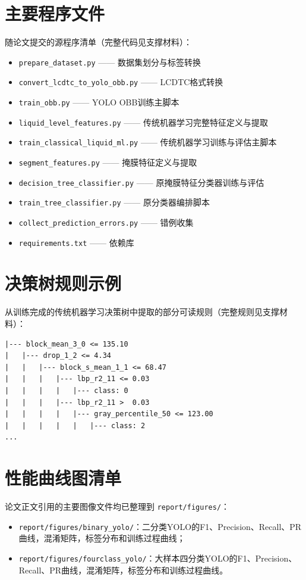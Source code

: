 \documentclass[withoutpreface,bwprint]{cumcmthesis}
\begin{document}
\newpage
\begin{appendices}
\section{主要程序文件}
随论文提交的源程序清单（完整代码见支撑材料）：
\begin{itemize}
    \item \texttt{prepare\_dataset.py} —— 数据集划分与标签转换
    \item \texttt{convert\_lcdtc\_to\_yolo\_obb.py} —— LCDTC格式转换
    \item \texttt{train\_obb.py} —— YOLO OBB训练主脚本
    \item \texttt{liquid\_level\_features.py} —— 传统机器学习完整特征定义与提取
    \item \texttt{train\_classical\_liquid\_ml.py} —— 传统机器学习训练与评估主脚本
    \item \texttt{segment\_features.py} —— 掩膜特征定义与提取
    \item \texttt{decision\_tree\_classifier.py} —— 原掩膜特征分类器训练与评估
    \item \texttt{train\_tree\_classifier.py} —— 原分类器编排脚本
    \item \texttt{collect\_prediction\_errors.py} —— 错例收集
    \item \texttt{requirements.txt} —— 依赖库
\end{itemize}

\section{决策树规则示例}
从训练完成的传统机器学习决策树中提取的部分可读规则（完整规则见支撑材料）：
\begin{verbatim}
|--- block_mean_3_0 <= 135.10
|   |--- drop_1_2 <= 4.34
|   |   |--- block_s_mean_1_1 <= 68.47
|   |   |   |--- lbp_r2_11 <= 0.03
|   |   |   |   |--- class: 0
|   |   |   |--- lbp_r2_11 >  0.03
|   |   |   |   |--- gray_percentile_50 <= 123.00
|   |   |   |   |   |--- class: 2
...
\end{verbatim}

\section{性能曲线图清单}
论文正文引用的主要图像文件均已整理到 \texttt{report/figures/}：
\begin{itemize}
    \item \texttt{report/figures/binary\_yolo/}：二分类YOLO的F1、Precision、Recall、PR曲线，混淆矩阵，标签分布和训练过程曲线；
    \item \texttt{report/figures/fourclass\_yolo/}：大样本四分类YOLO的F1、Precision、Recall、PR曲线，混淆矩阵，标签分布和训练过程曲线。
\end{itemize}

\end{appendices}
\end{document}

